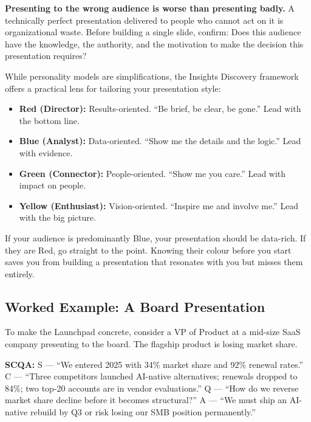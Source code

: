 \begin{alertbox}
\textbf{Presenting to the wrong audience is worse than presenting badly.} A technically perfect presentation delivered to people who cannot act on it is organizational waste. Before building a single slide, confirm: Does this audience have the knowledge, the authority, and the motivation to make the decision this presentation requires?
\end{alertbox}

\begin{insightbox}
While personality models are simplifications, the Insights Discovery framework offers a practical lens for tailoring your presentation style:

\begin{itemize}[leftmargin=1.2em]
  \item \textbf{Red (Director):} Results-oriented. ``Be brief, be clear, be gone.'' Lead with the bottom line.
  \item \textbf{Blue (Analyst):} Data-oriented. ``Show me the details and the logic.'' Lead with evidence.
  \item \textbf{Green (Connector):} People-oriented. ``Show me you care.'' Lead with impact on people.
  \item \textbf{Yellow (Enthusiast):} Vision-oriented. ``Inspire me and involve me.'' Lead with the big picture.
\end{itemize}

If your audience is predominantly Blue, your presentation should be data-rich. If they are Red, go straight to the point. Knowing their colour before you start saves you from building a presentation that resonates with you but misses them entirely.
\end{insightbox}

\subsection{Worked Example: A Board Presentation}

To make the Launchpad concrete, consider a VP of Product at a mid-size SaaS company presenting to the board. The flagship product is losing market share.

\textbf{SCQA:} S --- ``We entered 2025 with 34\% market share and 92\% renewal rates.'' C --- ``Three competitors launched AI-native alternatives; renewals dropped to 84\%; two top-20 accounts are in vendor evaluations.'' Q --- ``How do we reverse market share decline before it becomes structural?'' A --- ``We must ship an AI-native rebuild by Q3 or risk losing our SMB position permanently.''

